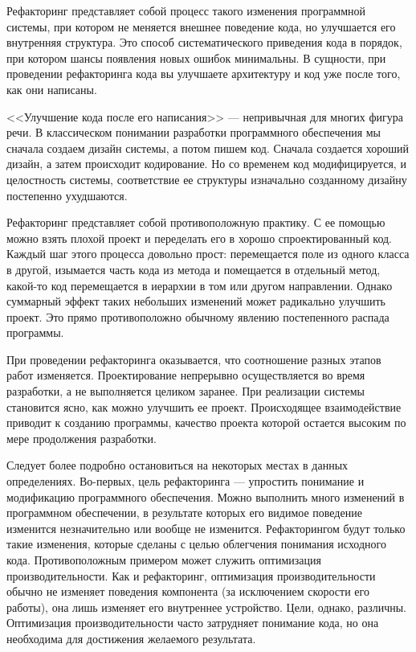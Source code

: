\documentclass{../../text-style}
\begin{document}
\maketitle
\thispagestyle{empty}


Рефакторинг представляет собой процесс такого изменения программной системы, при котором не меняется внешнее поведение кода, но улучшается его внутренняя структура. Это способ систематического приведения кода в порядок, при котором шансы появления новых ошибок минимальны. В сущности, при проведении рефакторинга кода вы улучшаете архитектуру и код уже после того, как они написаны.

<<Улучшение кода после его написания>> --- непривычная для многих фигура речи. В классическом понимании разработки программного обеспечения мы сначала создаем дизайн системы, а потом пишем код. Сначала создается хороший дизайн, а затем происходит кодирование. Но со временем код модифицируется, и целостность системы, соответствие ее структуры изначально созданному дизайну постепенно ухудшаются.

Рефакторинг представляет собой противоположную практику. С ее помощью можно взять плохой проект и переделать его в хорошо спроектированный код. Каждый шаг этого процесса довольно прост: перемещается поле из одного класса в другой, изымается часть кода из метода и помещается в отдельный метод, какой-то код перемещается в иерархии в том или другом направлении. Однако суммарный эффект таких небольших изменений может радикально улучшить проект. Это прямо противоположно обычному явлению постепенного распада программы.

При проведении рефакторинга оказывается, что соотношение разных этапов работ изменяется. Проектирование непрерывно осуществляется во время разработки, а не выполняется целиком заранее. При реализации системы становится ясно, как можно улучшить ее проект. Происходящее взаимодействие приводит к созданию программы, качество проекта которой остается высоким по мере продолжения разработки.

Следует более подробно остановиться на некоторых местах в данных определениях. Во-первых, цель рефакторинга --- упростить понимание и модификацию программного обеспечения. Можно выполнить много изменений в программном обеспечении, в результате которых его видимое поведение изменится незначительно или вообще не изменится. Рефакторингом будут только такие изменения, которые сделаны с целью облегчения понимания исходного кода. Противоположным примером может служить оптимизация производительности. Как и рефакторинг, оптимизация производительности обычно не изменяет поведения компонента (за исключением скорости его работы), она лишь изменяет его внутреннее устройство. Цели, однако, различны. Оптимизация производительности часто затрудняет понимание кода, но она необходима для достижения желаемого результата.
\end{document}
